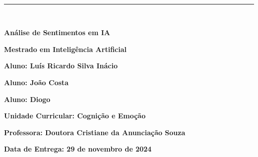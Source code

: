 \documentclass[a4paper,12pt]{report}
\begin{document}
	
	\begin{titlepage}
		\centering
		\vspace*{-2cm} %
		
		\hfill%
		\\[0.5cm]
		
		\noindent
		{\color{barraazul}\rule{\textwidth}{1mm}} %
		\\[1cm]
		
		{\LARGE  \textbf{Análise de Sentimentos em IA} \par}
		\vspace{1.5cm}
		
		{\Large \textbf{Mestrado em Inteligência Artificial}} \par
		\vspace{3cm}
		
		{\large \textbf{Aluno: Luís Ricardo Silva Inácio}} \par
		{\large \textbf{Aluno: João Costa}} \par
		{\large \textbf{Aluno: Diogo}} \par

		\vspace{3cm}
		
		{\large \textbf{Unidade Curricular: Cognição e Emoção}} \par
		\vspace{1cm}
		
		{\large \textbf{Professora: Doutora Cristiane da Anunciação Souza}} \par
		\vfill
		
		{\large \textbf{Data de Entrega: 29 de novembro de 2024}} \par
	\end{titlepage}
	
\end{document}
